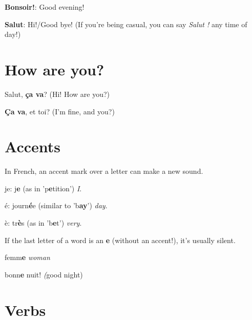 \documentclass[a4paper,10pt]{article}
\begin{document}
\textbf{Bonsoir!}: Good evening!


\textbf{Salut}: Hi!/Good bye! (If you're being casual, you can say \textit{Salut !}
 any time of day!)

 \section{How are you?}
 
 
 Salut, \textbf{ça va}? (Hi! How are you?)
 
 
 \textbf{Ça va}, et toi? (I'm fine, and you?)
 
 \section{Accents}
 In French, an accent mark
 over a letter can make a new sound.

 
 je: j\textbf{e} (as in 'p\textbf{e}tition') \textit{I}.
 
 
 é: journ\textbf{é}e (similar to 'b\textbf{ay}') \textit{day}.
 
 
 è: tr\textbf{è}s (as in 'b\textbf{e}t') \textit{very}.
 
 
 If the last letter of a word is an \textbf{e} (without an accent!), it's usually silent.
 
 femm\textbf{e} \textit{woman}

 
 bonn\textbf{e} nuit! \textit(good night)
 
 \section{Verbs}
 
 
 
\end{document}
